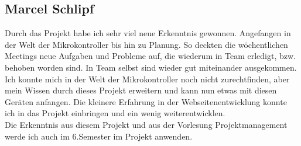 \subsection*{Marcel Schlipf}
Durch das Projekt habe ich sehr viel neue Erkenntnis gewonnen. Angefangen in der
Welt der Mikrokontroller bis hin zu Planung. So deckten die wöchentlichen
Meetings neue Aufgaben und Probleme auf, die wiederum in Team erledigt, bzw.
behoben worden sind. In Team selbst sind wieder gut miteinander ausgekommen.\\
Ich konnte mich in der Welt der Mikrokontroller noch nicht zurechtfinden, aber
mein Wissen durch dieses Projekt erweitern und kann nun etwas mit diesen Geräten
anfangen. Die kleinere Erfahrung in der Webseitenentwicklung konnte ich in das
Projekt einbringen und ein wenig weiterentwicklen.\\
Die Erkenntnis aus diesem Projekt und aus der Vorlesung Projektmanagement werde
ich auch im 6.Semester im Projekt anwenden.

